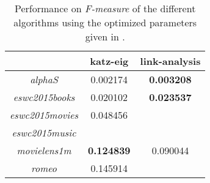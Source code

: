 \begin{table}[h!]
    \centering
    \begin{tabular}{| c | c | c | }
        \hline
        \textbf{}               & \textbf{katz-eig} & \textbf{link-analysis} \\ \hline
        \textit{alphaS}         & 0.002174          & \textbf{0.003208}      \\ \hline
        \textit{eswc2015books}  & 0.020102          & \textbf{0.023537}      \\ \hline
        \textit{eswc2015movies} & 0.048456          &                        \\ \hline
        \textit{eswc2015music}  &                   &                        \\ \hline
        \textit{movielens1m}    & \textbf{0.124839} & 0.090044               \\ \hline
        \textit{romeo}          & 0.145914          &                        \\ \hline
    \end{tabular}
    \caption{Performance on \textit{F-measure} of the different algorithms using the optimized parameters given in .}
    \label{tab:alg_full_perf}
\end{table}


